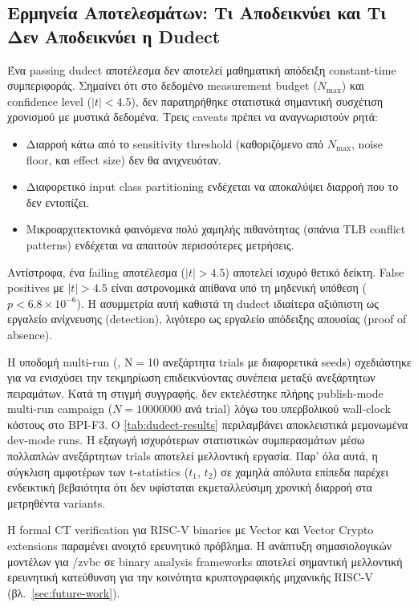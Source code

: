 \subsection{Ερμηνεία Αποτελεσμάτων: Τι Αποδεικνύει και Τι Δεν Αποδεικνύει
 η Dudect}
\label{ssec:ct-interpretation}

Ένα passing dudect αποτέλεσμα δεν αποτελεί μαθηματική απόδειξη
constant-time συμπεριφοράς. Σημαίνει ότι στο δεδομένο measurement budget
($N_{\max}$) και confidence level ($|t| < 4.5$), δεν παρατηρήθηκε
στατιστικά σημαντική συσχέτιση χρονισμού με μυστικά δεδομένα. Τρεις
caveats πρέπει να αναγνωριστούν ρητά:
\begin{itemize}
  \item Διαρροή κάτω από το sensitivity threshold (καθοριζόμενο από
    $N_{\max}$, noise floor, και effect size) δεν θα ανιχνευόταν.
  \item Διαφορετικό input class partitioning ενδέχεται να αποκαλύψει
    διαρροή που το  δεν εντοπίζει.
  \item Μικροαρχιτεκτονικά φαινόμενα πολύ χαμηλής πιθανότητας (σπάνια
    TLB conflict patterns) ενδέχεται να απαιτούν περισσότερες μετρήσεις.
\end{itemize}

Αντίστροφα, ένα failing αποτέλεσμα ($|t| > 4.5$) αποτελεί ισχυρό θετικό
δείκτη. False positives με $|t| > 4.5$ είναι αστρονομικά απίθανα υπό
τη μηδενική υπόθεση ($p < 6.8 \times 10^{-6}$). Η ασυμμετρία αυτή
καθιστά τη dudect ιδιαίτερα αξιόπιστη ως εργαλείο ανίχνευσης (detection),
λιγότερο ως εργαλείο απόδειξης απουσίας (proof of absence).

Η υποδομή multi-run (, N$=$10 ανεξάρτητα trials με
διαφορετικά seeds) σχεδιάστηκε για να ενισχύσει την τεκμηρίωση
επιδεικνύοντας συνέπεια μεταξύ ανεξάρτητων πειραμάτων. Κατά τη στιγμή
συγγραφής, δεν εκτελέστηκε πλήρης publish-mode multi-run campaign
($N = \num{10000000}$ ανά trial) λόγω του υπερβολικού wall-clock κόστους
στο BPI-F3. Ο \cref{tab:dudect-results} περιλαμβάνει αποκλειστικά
μεμονωμένα dev-mode runs. Η εξαγωγή ισχυρότερων στατιστικών
συμπερασμάτων μέσω πολλαπλών ανεξάρτητων trials αποτελεί μελλοντική
εργασία. Παρ' όλα αυτά, η σύγκλιση αμφοτέρων των t-statistics ($t_1$,
$t_2$) σε χαμηλά απόλυτα επίπεδα παρέχει ενδεικτική βεβαιότητα ότι δεν
υφίσταται εκμεταλλεύσιμη χρονική διαρροή στα μετρηθέντα variants.

Η formal CT verification για RISC-V binaries με Vector και Vector Crypto
extensions παραμένει ανοιχτό ερευνητικό πρόβλημα. Η ανάπτυξη
σημασιολογικών μοντέλων για \RVV/\gls{zvbc} σε binary analysis frameworks
αποτελεί σημαντική μελλοντική ερευνητική κατεύθυνση για την κοινότητα
κρυπτογραφικής μηχανικής RISC-V (βλ.\ \cref{sec:future-work}).

